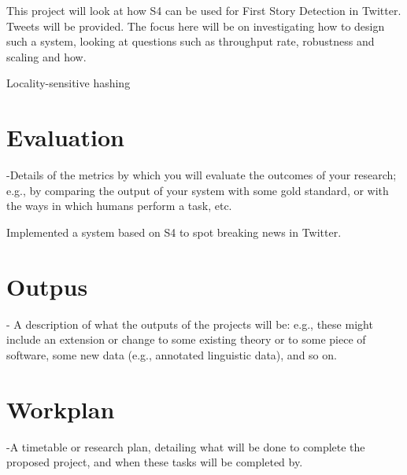 \documentclass[a4paper,12pt]{article}
\begin{document}
This project will look at how S4 can be used for First Story Detection in Twitter. Tweets will be provided. The focus here will be on investigating how to design such a system, looking at questions such as throughput rate, robustness and scaling and how.


Locality-sensitive hashing




\section{Evaluation}

-Details of the metrics by which you will evaluate the outcomes of your research; e.g., by comparing the output of your system with some gold standard, or with the ways in which humans perform a task, etc.


Implemented a system based on S4 to spot breaking news in Twitter.




\section{Outpus}

- A description of what the outputs of the projects will be: e.g., these might include an extension or change to some existing theory or to some piece of software, some new data (e.g., annotated linguistic data), and so on.





\section{Workplan}

-A timetable or research plan, detailing what will be done to complete the proposed project, and when these tasks will be completed by.









\end{document}
